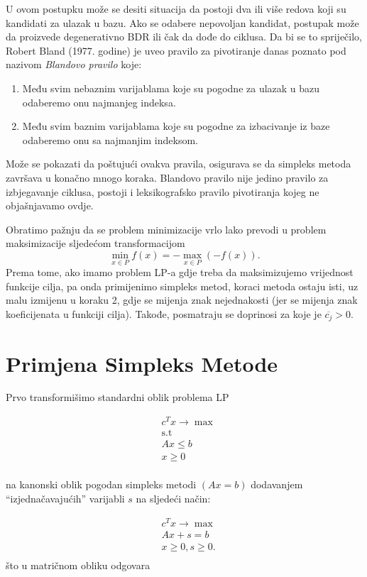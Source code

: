 \documentclass[a4paper, utf8, 11pt, colorlinks]{book}
\begin{document}
U ovom postupku  može se desiti situacija da postoji dva ili više redova koji su kandidati za ulazak u bazu. Ako se odabere nepovoljan kandidat, postupak može da proizvede degenerativno BDR ili čak da dođe do ciklusa. 
Da bi se to spriječilo, Robert Bland (1977. godine) je uveo pravilo za pivotiranje danas poznato pod
nazivom \emph{Blandovo pravilo} koje:
\begin{enumerate}
	\item   Među svim nebaznim varijablama koje su pogodne za ulazak u bazu odaberemo onu najmanjeg indeksa. 
    \item Među svim baznim varijablama koje su pogodne za izbacivanje iz baze odaberemo onu sa najmanjim indeksom.
\end{enumerate}
Može se pokazati da poštujući ovakva pravila, osigurava se da simpleks metoda  završava u konačno mnogo koraka. Blandovo pravilo nije jedino pravilo za izbjegavanje ciklusa, postoji i leksikografsko pravilo pivotiranja kojeg ne objašnjavamo ovdje.  

Obratimo pažnju da se problem minimizacije vrlo lako prevodi u problem maksimizacije sljedećom transformacijom
$$ \min_{ x \in P} f(x) = - \max_{x \in P}(-f(x)).$$ 
Prema tome, ako imamo problem LP-a gdje treba da maksimizujemo vrijednost funkcije cilja, pa onda primijenimo simpleks metod, koraci metoda ostaju isti, uz malu izmijenu u koraku 2, gdje se mijenja znak nejednakosti (jer se mijenja znak koeficijenata u funkciji cilja).  Takođe, posmatraju se doprinosi za koje je $\overline{c_j} > 0$.

\section{Primjena Simpleks Metode}
Prvo transformišimo standardni oblik problema LP
 
  \begin{align*}
    & c^T x \rightarrow \max \\
    & \mbox{s.t} \nonumber \\
    & Ax \leq b \\
    & x \geq 0\\
\end{align*}
 
na kanonski oblik pogodan simpleks metodi $(A {x} = b)$ dodavanjem ``izjednačavajućih'' varijabli $s$ na sljedeći način:
 
\begin{align}
    & c^T x \rightarrow \max \\
    & Ax + s =  b \\
    & x \geq 0, s \geq 0. \\
\end{align}
što u matričnom obliku odgovara 
\end{document}

